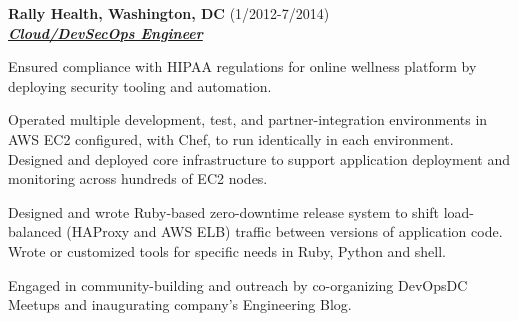 \documentclass{article}
\newcommand{\employer}[3]{{ \textbf{#1} (#2)\\ \underline{\textbf{\emph{#3}}}\\ \nopagebreak }}
\newenvironment{achievements}{\begin{list}{\topsep 0pt \itemsep -2pt}} {\vspace*{4pt}\end{list}}
\begin{document}
\employer{Rally Health, Washington, DC}{1/2012-7/2014}{Cloud/DevSecOps Engineer}
\begin{achievements}
  \item Ensured compliance with HIPAA regulations for online wellness platform by deploying security tooling and automation.
  \item Operated multiple development, test, and partner-integration environments in AWS EC2 configured, with Chef, to run identically in each environment. Designed and deployed core infrastructure to support application deployment and monitoring across hundreds of EC2 nodes.
  \item Designed and wrote Ruby-based zero-downtime release system to shift load-balanced (HAProxy and AWS ELB) traffic between versions of application code. Wrote or customized tools for specific needs in Ruby, Python and shell.
  \item Engaged in community-building and outreach by co-organizing DevOpsDC Meetups and inaugurating company's Engineering Blog.
\end{achievements}
\end{document}
